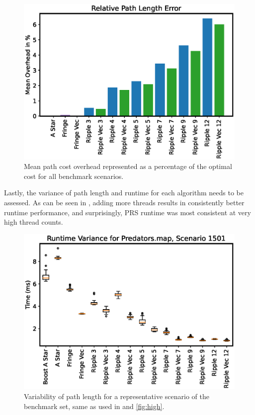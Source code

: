 \begin{figure}[H]
    \centering
    \includegraphics[width=\linewidth]{img/cost_overhead.eps}
    \caption{Mean path cost overhead represented as a percentage of the optimal cost for all benchmark scenarios.}
    \label{fig:cost-overhead}
\end{figure}

Lastly, the variance of path length and runtime for each algorithm needs to be assessed. 
As can be seen in , adding more threads results in consistently better runtime performance, and surprisingly, PRS runtime was most consistent at very high thread counts.

\begin{figure}[H]
    \centering
    \includegraphics[width=\linewidth]{img/scenario_time.eps}
    \caption{Variability of path length for a representative scenario of the benchmark set, same as used in  and \ref{fig:high}.}
    \label{fig:var-time}
\end{figure}

